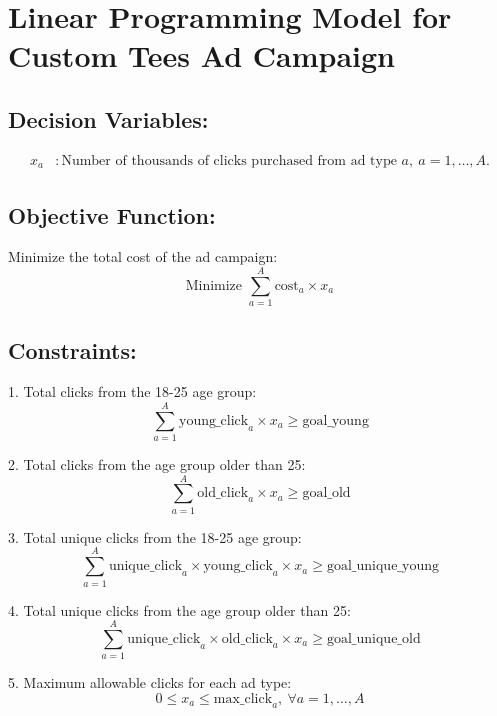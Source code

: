 \documentclass{article}
\begin{document}
\section*{Linear Programming Model for Custom Tees Ad Campaign}

\subsection*{Decision Variables:}
\begin{align*}
x_a &: \text{Number of thousands of clicks purchased from ad type } a,\ a = 1, \ldots, A.
\end{align*}

\subsection*{Objective Function:}
Minimize the total cost of the ad campaign:
\[
\text{Minimize } \sum_{a=1}^{A} \text{cost}_{a} \times x_a
\]

\subsection*{Constraints:}

1. Total clicks from the 18-25 age group:
\[
\sum_{a=1}^{A} \text{young\_click}_{a} \times x_a \geq \text{goal\_young}
\]

2. Total clicks from the age group older than 25:
\[
\sum_{a=1}^{A} \text{old\_click}_{a} \times x_a \geq \text{goal\_old}
\]

3. Total unique clicks from the 18-25 age group:
\[
\sum_{a=1}^{A} \text{unique\_click}_{a} \times \text{young\_click}_{a} \times x_a \geq \text{goal\_unique\_young}
\]

4. Total unique clicks from the age group older than 25:
\[
\sum_{a=1}^{A} \text{unique\_click}_{a} \times \text{old\_click}_{a} \times x_a \geq \text{goal\_unique\_old}
\]

5. Maximum allowable clicks for each ad type:
\[
0 \leq x_a \leq \text{max\_click}_{a},\ \forall a = 1, \ldots, A
\]
\end{document}
